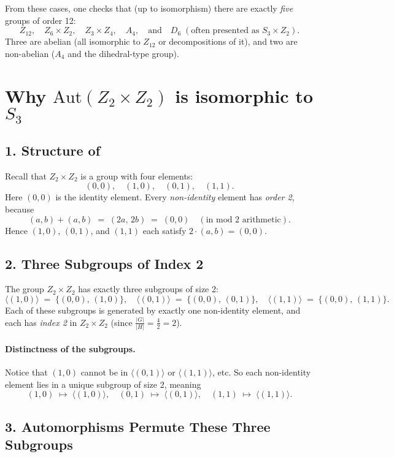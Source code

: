 \documentclass[12pt]{article}
\theoremstyle{definition} %
\theoremstyle{plain} %
\begin{document}
From these cases, one checks that (up to isomorphism) there are exactly \emph{five} groups of order 12:
\[
  Z_{12}, \quad
  Z_6 \times Z_2, \quad
  Z_3 \times Z_4, \quad
  A_4, \quad
  \text{and} \quad
  D_{6} \;(\text{often presented as } S_3 \times Z_2).
\]
Three are abelian (all isomorphic to $Z_{12}$ or decompositions of it), and two are non-abelian ($A_4$ and the dihedral-type group).
\section*{Why \texorpdfstring{$\mathrm{Aut}(Z_2 \times Z_2)$}{Aut(Z2 x Z2)} is isomorphic to \texorpdfstring{$S_3$}{S3}}

\subsection*{1. Structure of }
Recall that $Z_2 \times Z_2$ is a group with four elements:
\[
  (0,0),\quad (1,0),\quad (0,1),\quad (1,1).
\]
Here $(0,0)$ is the identity element.  Every \emph{non-identity} element has \emph{order 2}, because
\[
   (a,b) + (a,b) \;=\; (2a,\,2b) \;=\; (0,0)
   \quad (\text{in mod 2 arithmetic}).
\]
Hence $(1,0)$, $(0,1)$, and $(1,1)$ each satisfy $2\cdot (a,b) = (0,0)$.

\subsection*{2. Three Subgroups of Index 2}

The group $Z_2 \times Z_2$ has exactly three subgroups of size 2:
\[
  \langle (1,0)\rangle \;=\;\{(0,0),\,(1,0)\}, \quad
  \langle (0,1)\rangle \;=\;\{(0,0),\,(0,1)\}, \quad
  \langle (1,1)\rangle \;=\;\{(0,0),\,(1,1)\}.
\]
Each of these subgroups is generated by exactly one non-identity element, 
and each has \emph{index 2} in $Z_2 \times Z_2$ (since $\frac{|G|}{|H|}= \frac{4}{2} = 2$).

\paragraph{Distinctness of the subgroups.} 
Notice that $(1,0)$ cannot be in $\langle(0,1)\rangle$ or $\langle(1,1)\rangle$, etc. 
So each non-identity element lies in a unique subgroup of size 2, meaning
\[
  (1,0) \;\mapsto\; \langle (1,0)\rangle, \quad
  (0,1) \;\mapsto\; \langle (0,1)\rangle, \quad
  (1,1) \;\mapsto\; \langle (1,1)\rangle.
\]

\subsection*{3. Automorphisms Permute These Three Subgroups}
\end{document}
